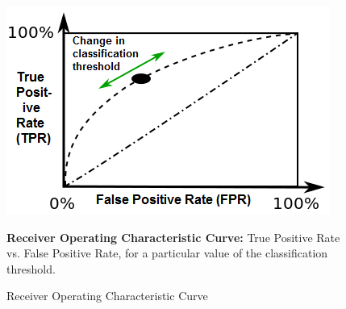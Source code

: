 


\begin{figure}[h!]

\begin{center}

    \caption{Receiver Operating Characteristic Curve} \label{fig:ROCcurve1}

        \includegraphics[scale=  0.75]{Figs/ROC/ROC_curve_3.png}



\end{center}

    \footnotesize

        \textbf{Receiver Operating Characteristic Curve:}
        True Positive Rate vs. False Positive Rate, for a particular value of the classification threshold.


\end{figure}



